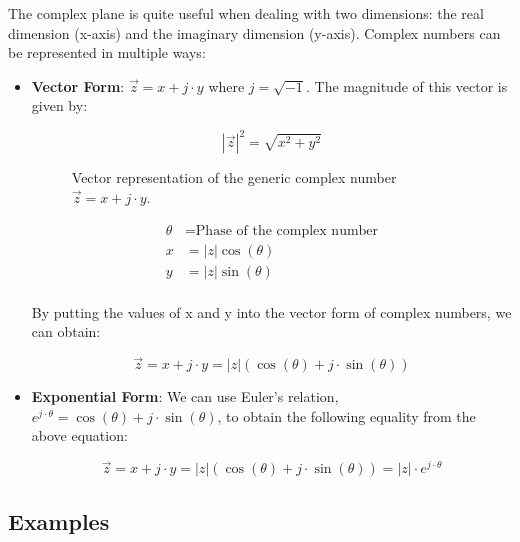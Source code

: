 \documentclass[letterpaper,12pt]{article}
\begin{document}
The complex plane is quite useful when dealing with two dimensions: the real dimension (x-axis) and the imaginary dimension (y-axis). Complex numbers can be represented in multiple ways:
\begin{itemize}
    \item \textbf{Vector Form}: \(\Vec{z} = x + j\cdot y\) where $j=\sqrt{-1}$. The magnitude of this vector is given by:

          \[|\Vec{z}|^2 = \sqrt{x^2 + y^2}\]

          \begin{figure}[!ht]
              \centering
              \caption{Vector representation of the generic complex number \(\Vec{z} = x + j\cdot y\).}\label{fig:signal_vector_graph}
          \end{figure}

          \begin{align*}
              \theta & = \text{Phase of the complex number} \\
              x      & = |z|\cos(\theta)                    \\
              y      & = |z|\sin(\theta)                    \\
          \end{align*}

          By putting the values of x and y into the vector form of complex numbers, we can obtain:

          \[\Vec{z} = x + j\cdot y = |z|(\cos(\theta) + j\cdot \sin(\theta))\]

    \item \textbf{Exponential Form}: We can use Euler's relation, \(e^{j\cdot \theta} = \cos(\theta) + j\cdot \sin(\theta)\), to obtain the following equality from the above equation:

          \begin{equation}
              \Vec{z} = x + j\cdot y = |z|(\cos(\theta) + j\cdot \sin(\theta)) = |z|\cdot e^{j\cdot \theta}
              \label{eq:euler_complex_no}
          \end{equation}


\end{itemize}

\subsection*{Examples}
\end{document}
